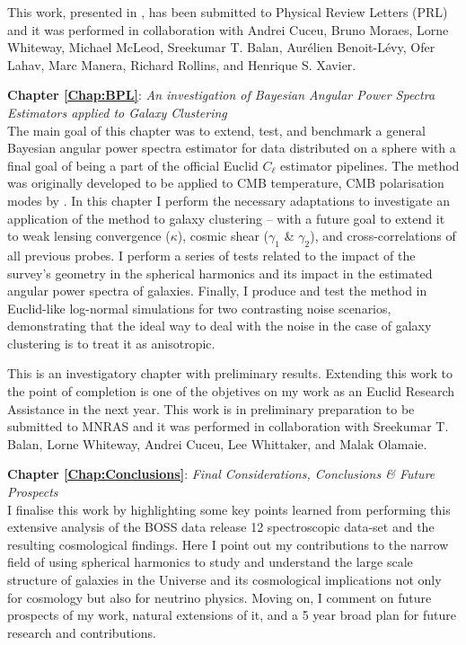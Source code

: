 \qquad This work, presented in \cite{2018LoureiroNeutrinos}, has been submitted to Physical Review Letters (PRL) and it was performed in collaboration with  Andrei Cuceu, Bruno Moraes, Lorne Whiteway, Michael McLeod, Sreekumar T. Balan, Aur\'elien Benoit-L\'evy, Ofer Lahav, Marc Manera, Richard Rollins, and Henrique S. Xavier.

\bigskip

\textbf{Chapter \ref{Chap:BPL}}: \textit{An investigation of Bayesian Angular Power Spectra Estimators applied to Galaxy Clustering} \\[0.6em]
The main goal of this chapter was to extend, test, and benchmark a general Bayesian angular power spectra estimator for data distributed on a sphere with a final goal of being a part of the official Euclid $C_{\ell}$ estimator pipelines. The method was originally developed to be applied to CMB temperature, CMB polarisation modes by \cite{SreeThesis}. In this chapter I perform the necessary adaptations to investigate an application of the method to galaxy clustering -- with a future goal to extend it to weak lensing convergence ($\kappa$), cosmic shear ($\gamma_1$ \& $\gamma_2$), and cross-correlations of all previous probes. I perform a series of tests related to the impact of the survey's geometry in the spherical harmonics and its impact in the estimated angular power spectra of galaxies. Finally, I produce and test the method in Euclid-like log-normal simulations for two contrasting noise scenarios, demonstrating that the ideal way to deal with the noise in the case of galaxy clustering is to treat it as anisotropic.

\qquad This is an investigatory chapter with preliminary results. Extending this work to the point of completion is one of the objetives on my work as an Euclid Research Assistance in the next year. This work is in preliminary preparation to be submitted to MNRAS and it was performed in collaboration with Sreekumar T. Balan, Lorne Whiteway, Andrei Cuceu, Lee Whittaker, and Malak Olamaie.

\bigskip

\textbf{Chapter \ref{Chap:Conclusions}}: \textit{Final Considerations, Conclusions \& Future Prospects} \\[0.6em]
I finalise this work by highlighting some key points learned from performing this extensive analysis of the BOSS data release 12 spectroscopic data-set and the resulting cosmological findings. Here I point out my contributions to the narrow field of using spherical harmonics to study and understand the large scale structure of galaxies in the Universe and its cosmological implications not only for cosmology but also for neutrino physics. Moving on, I comment on future prospects of my work, natural extensions of it, and a 5 year broad plan for future research and contributions.

